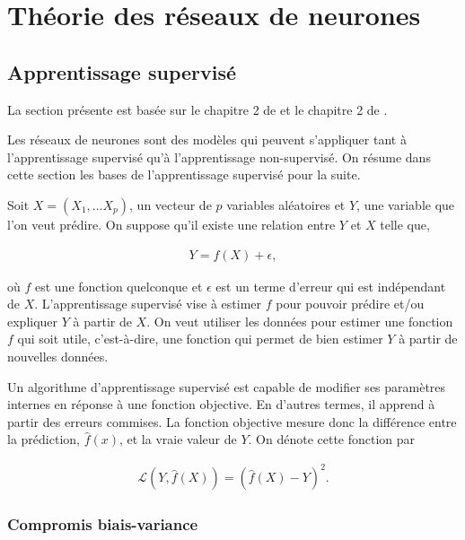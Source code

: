 \chapter{Théorie des réseaux de neurones}     
\label{chap:RN}                   

\section{Apprentissage supervisé}
\label{sec:RN:ML}

La section présente est basée sur le chapitre 2 de \citet{james2013introduction} et le chapitre 2 de \citet{Hastie/etal:2009}.

Les réseaux de neurones sont des modèles qui peuvent s'appliquer tant à l'apprentissage supervisé qu'à l'apprentissage non-supervisé. On résume dans cette section les bases de l'apprentissage supervisé pour la suite.

Soit $X=\left(X_1, \dots X_p \right)$, un vecteur de $p$ variables aléatoires et $Y$, une variable que l'on veut prédire. On suppose qu'il existe une relation entre $Y$ et $X$ telle que,

\begin{align*}
Y = f(X) + \epsilon,
\end{align*} 

où $f$ est une fonction quelconque et $\epsilon$ est un terme d'erreur qui est indépendant de $X$. L'apprentissage supervisé vise à estimer $f$ pour pouvoir prédire et/ou expliquer $Y$ à partir de $X$. On veut utiliser les données pour estimer une fonction $f$ qui soit utile, c'est-à-dire, une fonction qui permet de bien estimer $Y$ à partir de nouvelles données. 

Un algorithme d'apprentissage supervisé est capable de modifier ses paramètres internes en réponse à une fonction objective. En d'autres termes, il apprend à partir des erreurs commises.  La fonction objective mesure donc la différence entre la prédiction, $\hat{f}(x)$, et la vraie valeur de $Y$. On dénote cette fonction par 

\begin{align*}
\mathcal{L} \left( Y, \hat{f}(X) \right)= \left( \hat{f}(X) - Y\right)^2.
\end{align*}

\subsection{Compromis biais-variance}
\label{subsec:RN:ML:biais-var}

